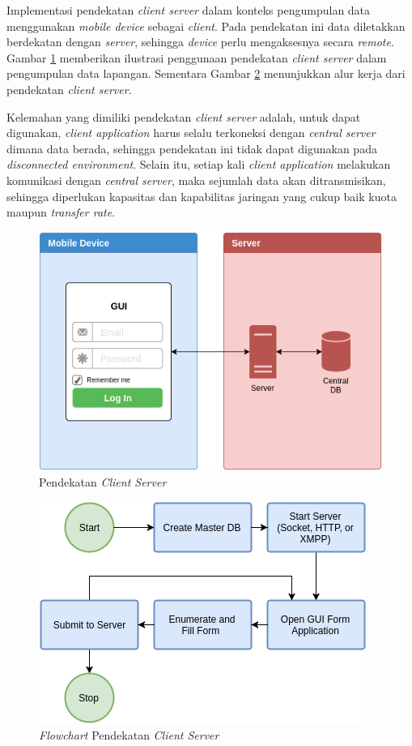 Implementasi pendekatan \textit{client server} dalam konteks pengumpulan data menggunakan \textit{mobile device} sebagai \textit{client}. Pada pendekatan ini data diletakkan berdekatan dengan \textit{server}, sehingga \textit{device} perlu mengaksesnya secara \textit{remote}. Gambar \ref{fig:design-client-server} memberikan ilustrasi penggunaan pendekatan \textit{client server} dalam pengumpulan data lapangan. Sementara Gambar \ref{fig:design-client-server-flowchart} menunjukkan alur kerja dari pendekatan \textit{client server}.


Kelemahan yang dimiliki pendekatan \textit{client server} adalah, untuk dapat digunakan, \textit{client application} harus selalu terkoneksi dengan \textit{central server} dimana data berada, sehingga pendekatan ini tidak dapat digunakan pada \textit{disconnected environment}. Selain itu, setiap kali \textit{client application} melakukan komunikasi dengan \textit{central server}, maka sejumlah data akan ditransmisikan, sehingga diperlukan kapasitas dan kapabilitas jaringan yang cukup baik kuota maupun \textit{transfer rate}. 

\begin{figure}[h]
    \centering
    \includegraphics[width=.7\textwidth]{../../Resources/Images/design-client-server}
    \caption{Pendekatan \textit{Client Server}}
    \label{fig:design-client-server}
\end{figure}

\begin{figure}[h]
    \centering
    \includegraphics[width=.7\textwidth]{../../Resources/Images/design-client-server-flowchart}
    \caption{\textit{Flowchart} Pendekatan \textit{Client Server}}
    \label{fig:design-client-server-flowchart}
\end{figure}


